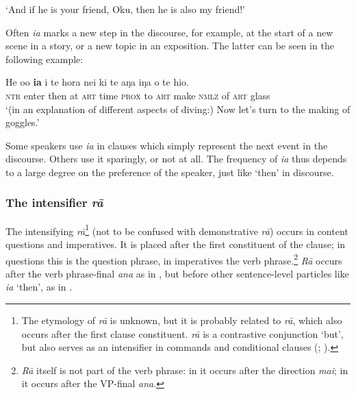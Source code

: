 \glt
‘And if he is your friend, Oku, then he is also my friend!’ \textstyleExampleref{[R535.151]} 
\z

Often \textit{ia} marks a new step in the discourse, for example, at the start of a new scene in a story, or a new topic in an exposition. The latter can be seen in the following example:

\ea\label{ex:4.175}
\gll He o{\ꞌ}o \textbf{ia} {\ꞌ}i te hora nei ki te aŋa iŋa o te hi{\ꞌ}o. \\
\textsc{ntr} enter then at \textsc{art} time \textsc{prox} to \textsc{art} make \textsc{nmlz} of \textsc{art} glass \\

\glt
‘(in an explanation of different aspects of diving:) Now let’s turn to the making of goggles.’ \textstyleExampleref{[R360.026]} 
\z

Some speakers use \textit{ia} in clauses which simply represent the next event in the discourse. Others use it sparingly, or not at all. The frequency of \textit{ia} thus depends to a large degree on the preference of the speaker, just like ‘then’ in  discourse.
\subsubsection[The intensifier rā]{The intensifier \textit{rā}}\label{sec:4.5.4.4}
The intensifying  \textit{rā}\footnote{\label{fn:205}The etymology of \textit{rā} is unknown, but it is probably related to  \textit{rā}, which also occurs after the first clause constituent.  \textit{rā} is a contrastive conjunction ‘but’, but also serves as an intensifier in commands and conditional clauses (\citealt[98]{LazardPeltzer2000}; \citealt[399]{AcadémieTahitienne1999}).} (not to be confused with demonstrative \textit{rā}) occurs in content questions and imperatives. It is placed after the first constituent of the clause; in questions this is the question phrase, in imperatives the verb phrase.\footnote{\label{fn:206}\textit{Rā} itself is not part of the verb phrase: in  it occurs after the direction \textit{mai}; in  it occurs after the VP{}-final  \textit{{\ꞌ}ana}.} \textit{Rā} occurs after the verb phrase-final  \textit{{\ꞌ}ana} as in , but before other sentence-level particles like \textit{ia} ‘then’, as in .

